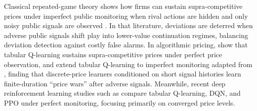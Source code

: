 \documentclass{article}
\begin{document}
Classical repeated-game theory shows how firms can sustain supra-competitive prices under imperfect public monitoring when rival actions are hidden and only noisy public signals are observed \citep{green1984noncooperative, abreu1990toward, fudenberg1994folk}. In that literature, deviations are deterred when adverse public signals shift play into lower-value continuation regimes, balancing deviation detection against costly false alarms. In algorithmic pricing, \citet{calvano2020artificial} show that tabular Q-learning sustains supra-competitive prices under perfect price observation, and \citet{calvano2021algorithmic} extend tabular Q-learning to imperfect monitoring adapted from \citet{green1984noncooperative}, finding that discrete-price learners conditioned on short signal histories learn finite-duration ``price wars'' after adverse signals. Meanwhile, recent deep reinforcement learning studies such as \citet{deng2025exploring} compare tabular Q-learning, DQN, and PPO under perfect monitoring, focusing primarily on converged price levels.
\end{document}
